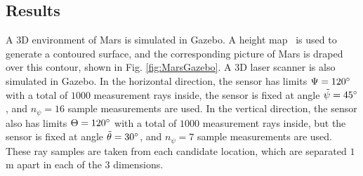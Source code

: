 \documentclass[conf]{new-aiaa}
\begin{document}
\subsection{Results}

A 3D environment of Mars is simulated in Gazebo. A height map~\cite{mapaplanet} is used to generate a contoured surface, and the corresponding picture of Mars is draped over this contour, shown in Fig. \ref{fig:MarsGazebo}. A 3D laser scanner is also simulated in Gazebo. In the horizontal direction, the sensor has limits $\Psi=120\degree$ with a total of $1000$ measurement rays inside, the sensor is fixed at angle $\tilde{\psi}=45\degree$, and $n_\psi=16$ sample measurements are used. In the vertical direction, the sensor also has limits $\Theta=120\degree$ with a total of $1000$ measurement rays inside, but the sensor is fixed at angle $\tilde{\theta}=30\degree$, and $n_\psi=7$ sample measurements are used. These ray samples are taken from each candidate location, which are separated $1$ m apart in each of the $3$ dimensions.

\end{document}
